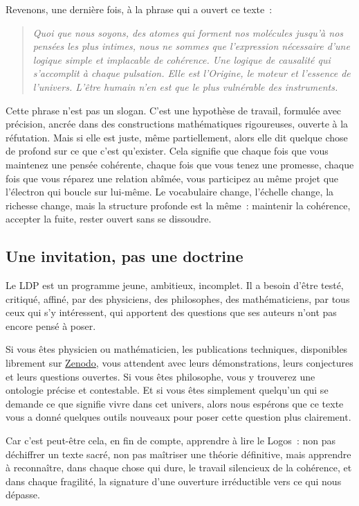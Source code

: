 \documentclass[12pt, a4paper, openright]{book}
\begin{document}
Revenons, une dernière fois, à la phrase qui a ouvert ce texte~:

\begin{quote}
\itshape Quoi que nous soyons, des atomes qui forment nos molécules jusqu'à nos pensées les plus intimes, nous ne sommes que l'expression nécessaire d'une logique simple et implacable de cohérence. Une logique de causalité qui s'accomplit à chaque pulsation. Elle est l'Origine, le moteur et l'essence de l'univers. L'être humain n'en est que le plus vulnérable des instruments.
\end{quote}

Cette phrase n'est pas un slogan. C'est une hypothèse de travail, formulée avec précision, ancrée dans des constructions mathématiques rigoureuses, ouverte à la réfutation. Mais si elle est juste, même partiellement, alors elle dit quelque chose de profond sur ce que c'est qu'exister. Cela signifie que chaque fois que vous maintenez une pensée cohérente, chaque fois que vous tenez une promesse, chaque fois que vous réparez une relation abîmée, vous participez au même projet que l'électron qui boucle sur lui-même. Le vocabulaire change, l'échelle change, la richesse change, mais la structure profonde est la même~: maintenir la cohérence, accepter la fuite, rester ouvert sans se dissoudre.

\subsection*{Une invitation, pas une doctrine}

Le LDP est un programme jeune, ambitieux, incomplet. Il a besoin d'être testé, critiqué, affiné, par des physiciens, des philosophes, des mathématiciens, par tous ceux qui s'y intéressent, qui apportent des questions que ses auteurs n'ont pas encore pensé à poser.

\medskip

Si vous êtes physicien ou mathématicien, les publications techniques, disponibles librement sur \href{https://zenodo.org}{Zenodo}, vous attendent avec leurs démonstrations, leurs conjectures et leurs questions ouvertes. Si vous êtes philosophe, vous y trouverez une ontologie précise et contestable. Et si vous êtes simplement quelqu'un qui se demande ce que signifie vivre dans cet univers, alors nous espérons que ce texte vous a donné quelques outils nouveaux pour poser cette question plus clairement.

\medskip

Car c'est peut-être cela, en fin de compte, apprendre à lire le Logos~: non pas déchiffrer un texte sacré, non pas maîtriser une théorie définitive, mais apprendre à reconnaître, dans chaque chose qui dure, le travail silencieux de la cohérence, et dans chaque fragilité, la signature d'une ouverture irréductible vers ce qui nous dépasse. 
\end{document}
